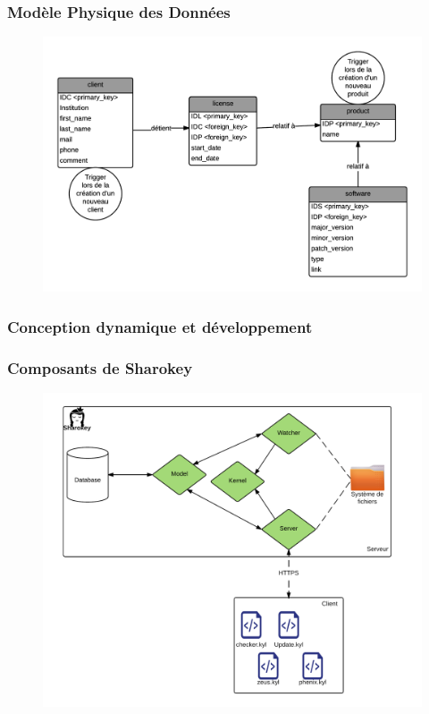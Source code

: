 \documentclass{beamer}
\begin{document}
\begin{frame}
\frametitle{Modèle Physique des Données}
\begin{figure}
\centering
\includegraphics[scale=0.6]{images/MPD_sharokey.png}
\end{figure}
\end{frame}
\subsubsection{Conception dynamique et développement}
\begin{frame}
\frametitle{Composants de Sharokey}
\begin{figure}
\centering
\includegraphics[scale=0.5]{images/composants.png}
\end{figure}
\end{frame}
\end{document}

